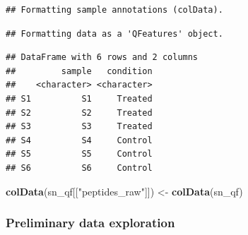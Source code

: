 \documentclass[9pt,a4paper,]{extarticle}
\newenvironment{Shaded}{\begin{snugshade}}{\end{snugshade}}
\newcommand{\AttributeTok}[1]{\textcolor[rgb]{0.13,0.29,0.53}{#1}}
\newcommand{\DecValTok}[1]{\textcolor[rgb]{0.00,0.00,0.81}{#1}}
\newcommand{\DocumentationTok}[1]{\textcolor[rgb]{0.56,0.35,0.01}{\textbf{\textit{#1}}}}
\newcommand{\FunctionTok}[1]{\textcolor[rgb]{0.13,0.29,0.53}{\textbf{#1}}}
\newcommand{\NormalTok}[1]{#1}
\newcommand{\OtherTok}[1]{\textcolor[rgb]{0.56,0.35,0.01}{#1}}
\newcommand{\SpecialCharTok}[1]{\textcolor[rgb]{0.81,0.36,0.00}{\textbf{#1}}}
\newcommand{\StringTok}[1]{\textcolor[rgb]{0.31,0.60,0.02}{#1}}
\begin{document}
\begin{verbatim}
## Formatting sample annotations (colData).
\end{verbatim}

\begin{verbatim}
## Formatting data as a 'QFeatures' object.
\end{verbatim}

\begin{Shaded}
\end{Shaded}

\begin{verbatim}
## DataFrame with 6 rows and 2 columns
##         sample   condition
##    <character> <character>
## S1          S1     Treated
## S2          S2     Treated
## S3          S3     Treated
## S4          S4     Control
## S5          S5     Control
## S6          S6     Control
\end{verbatim}

\begin{Shaded}
\begin{Highlighting}[]
\FunctionTok{colData}\NormalTok{(sn\_qf[[}\StringTok{"peptides\_raw"}\NormalTok{]]) }\OtherTok{\textless{}{-}} \FunctionTok{colData}\NormalTok{(sn\_qf)}
\end{Highlighting}
\end{Shaded}

\subsubsection{Preliminary data exploration}\label{preliminary-data-exploration-1}
\end{document}
